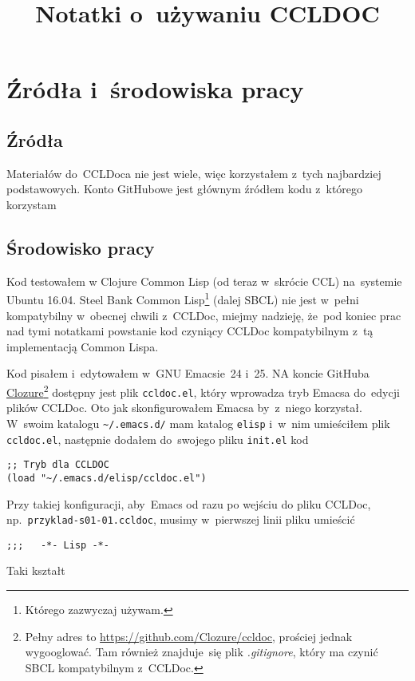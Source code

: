 \documentclass[a4paper,11pt]{article}  %
\title{Notatki o~używaniu CCLDOC}
\begin{document}


\lstset{language=Lisp}


\maketitle %

\tableofcontents



\section{Źródła i~środowiska pracy}


\subsection{Źródła}

Materiałów do~CCLDoca nie jest wiele, więc korzystałem z~tych najbardziej podstawowych. Konto GitHubowe jest głównym źródłem kodu z~którego korzystam


\subsection{Środowisko pracy}

Kod testowałem w Clojure Common Lisp (od teraz w~skrócie CCL)
na~systemie Ubuntu 16.04. Steel Bank Common Lisp\footnote{Którego
  zazwyczaj używam.} (dalej SBCL) nie jest w~pełni kompatybilny
w~obecnej chwili z~CCLDoc, miejmy nadzieję, że~pod koniec prac nad
tymi notatkami powstanie kod czyniący CCLDoc kompatybilnym z~tą
implementacją Common Lispa.

Kod pisałem i~edytowałem w~GNU Emacsie~24 i~25. NA koncie GitHuba
\href{https://github.com/Clozure/ccldoc}{Clozure}\footnote{Pełny adres
  to \href{https://github.com/Clozure/ccldoc}
  {https://github.com/Clozure/ccldoc}, prościej jednak wygooglować.
  Tam również znajduje~się plik \emph{.gitignore}, który ma czynić
  SBCL kompatybilnym z~CCLDoc.} dostępny jest plik \verb+ccldoc.el+,
który wprowadza tryb Emacsa do~edycji plików CCLDoc. Oto jak
skonfigurowałem Emacsa by~z~niego korzystał. W~swoim katalogu
\verb+~/.emacs.d/+ mam katalog \verb+elisp+ i~w~nim umieściłem plik
\verb+ccldoc.el+, następnie dodałem do~swojego pliku \verb+init.el+
kod
\begin{lstlisting}
;; Tryb dla CCLDOC
(load "~/.emacs.d/elisp/ccldoc.el")
\end{lstlisting}
Przy takiej konfiguracji, aby~Emacs od razu po wejściu do pliku CCLDoc, np.~\verb+przyklad-s01-01.ccldoc+, musimy w~pierwszej linii pliku umieścić
\begin{lstlisting}
;;;   -*- Lisp -*-
\end{lstlisting}
Taki kształt
\end{document}
